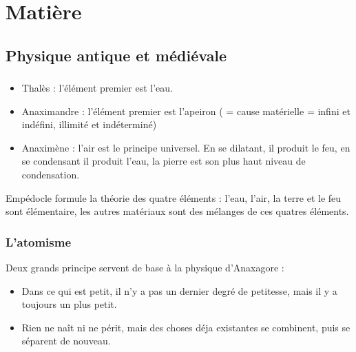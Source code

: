 \chapter{Matière}


\begin{comment}
\end{comment}
\section{Physique antique et médiévale}

\subsection{}

\begin{itemize}[leftmargin=1cm, label=, itemsep=5pt]
\item Thalès : l'élément premier est l'eau.
\item Anaximandre : l'élément premier est l'apeiron ( = cause matérielle = infini et indéfini, illimité et indéterminé)
\item Anaximène : l'air est le principe universel. En se dilatant, il produit le feu, en se condensant il produit l'eau, la pierre est son plus haut niveau de condensation.
\end{itemize}

Empédocle formule la théorie des quatre éléments : l'eau, l'air, la terre et le feu sont élémentaire, les autres matériaux sont des mélanges de ces quatres éléments.

\begin{comment}
\item Platon : les éléments derniers de la matière sont les corps simples.
\end{comment}

\subsection{L'atomisme}

Deux grands principe servent de base à la physique d'Anaxagore :

\begin{itemize}[leftmargin=1cm, label=, itemsep=5pt]
\item Dans ce qui est petit, il n'y a pas un dernier degré de petitesse, mais il y a toujours un plus petit.
\item Rien ne naît ni ne périt, mais des choses déja existantes se combinent, puis se séparent de nouveau.
\end{itemize}

